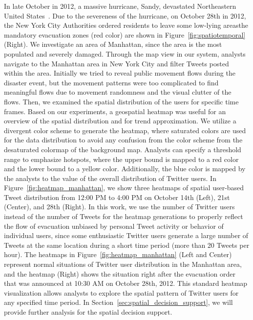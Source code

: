 In late October in 2012, a massive hurricane, Sandy, devastated Northeastern United States~\cite{WKP:2012:SANDY}.
Due to the severeness of the hurricane,  on October 28th in 2012, the New York City Authorities ordered residents to leave some low-lying areas\textemdash the mandatory evacuation zones (red color) are shown in Figure~\ref{fig:spatiotemporal} (Right).
We investigate an area of Manhattan, since the area is the most populated and severely damaged.
Through the map view in our system, analysts navigate to the Manhattan area in New York City and filter Tweets posted within the area. 
Initially we tried to reveal public movement flows during the disaster event, but the movement patterns were too complicated to find meaningful flows due to movement randomness and the visual clutter of the flows.
Then, we examined the spatial distribution of the users for specific time frames.
Based on our experiments, a geospatial heatmap was useful for an overview of the spatial distribution and for trend approximation.
We utilize a divergent color scheme to generate the heatmap, where saturated colors are used for the data distribution to avoid any confusion from the color scheme from the desaturated colormap of the background map.
Analysts can specify a threshold range to emphasize hotspots, where the upper bound is mapped to a red color and the lower bound to a yellow color.
Additionally, the blue color is mapped by the analysts to the value of the overall distribution of Twitter users.
In Figure~\ref{fig:heatmap_manhattan}, we show three heatmaps of spatial user-based Tweet distribution from 12:00 PM to 4:00 PM on October 14th (Left), 21st (Center), and 28th (Right).
In this work, we use the number of Twitter users instead of the number of Tweets for the heatmap generations to properly reflect the flow of evacuation unbiased by personal Tweet activity or behavior of individual users, since some enthusiastic Twitter users generate a large number of Tweets at the same location during a short time period (more than 20 Tweets per hour).
The heatmaps in Figure~\ref{fig:heatmap_manhattan} (Left and Center) represent normal situations of Twitter user distribution in the Manhattan area, and the heatmap (Right) shows the situation right after the evacuation order that was announced at 10:30 AM on October 28th, 2012.
This standard heatmap visualization allows analysts to explore the spatial pattern of Twitter users for any specified time period.
In Section~\ref{sec:spatial_decision_support}, we will provide further analysis for the spatial decision support.

